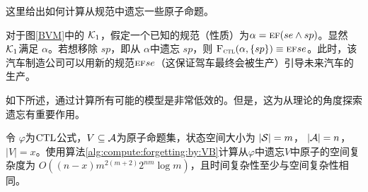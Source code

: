 这里给出如何计算从规范中遗忘一些原子命题。 
\begin{example}\label{ex:6}
	对于图\ref{BVM}中的 ${\cal K}_1$，假定一个已知的规范（性质）为$\alpha = \textsc{e}\textsc{f}(se \wedge sp)$。显然 ${\cal K}_1$满足 $\alpha$。若想移除 $sp$，即从 $\alpha$中遗忘 $sp$，则 ${\textsc{F}_{\textsc{ctl}}}(\alpha,\{ sp\}) \equiv \textsc{e}\textsc{f} se$。此时，该汽车制造公司可以用新的规范$\textsc{e}\textsc{f} se$（这保证驾车最终会被生产）引导未来汽车的生产。
\end{example}


如下所述，通过计算所有可能的模型是非常低效的。但是，这为从理论的角度探索遗忘有重要作用。


\begin{proposition}\label{pro:time:alg1}
	令 $\varphi$为$\textrm{CTL}$公式，$V\subseteq {\cal A}$为原子命题集，状态空间大小为 $|{\cal S}|=m$， $|{\cal A}|=n$，$|V|=x$。使用算法\ref{alg:compute:forgetting:by:VB}计算从$\varphi$中遗忘$V$中原子的空间复杂度为 $O((n-x)m^{2(m+2)}2^{nm}  \log m)$，且时间复杂性至少与空间复杂性相同。
\end{proposition}
